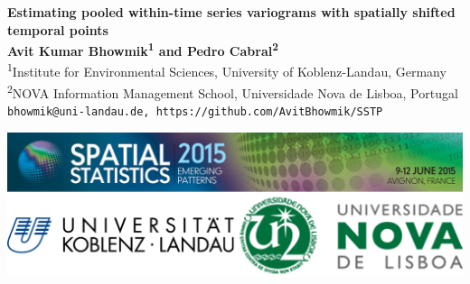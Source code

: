 \documentclass[a0,portrait]{a0poster}
\begin{document}


\begin{minipage}[b]{0.723\linewidth}
\veryHuge \color{NavyBlue} \textbf{Estimating pooled within-time series variograms with spatially shifted temporal points} \color{Black}\\[2cm]%
\huge \textbf{Avit Kumar Bhowmik\textsuperscript{1} and Pedro Cabral\textsuperscript{2}}\\[0.5cm] %
\LARGE \textsuperscript{1}Institute for Environmental Sciences, University of Koblenz-Landau, Germany\\
\LARGE \textsuperscript{2}NOVA Information Management School, Universidade Nova de Lisboa, Portugal\\[0.4cm] %
\Large \texttt{bhowmik@uni-landau.de, https://github.com/AvitBhowmik/SSTP}\\
\end{minipage}
%
\begin{minipage}[b]{0.277\linewidth}
\includegraphics[width=20cm]{logo.png}\\
\end{minipage}

\vspace{1cm} %

\end{document}
